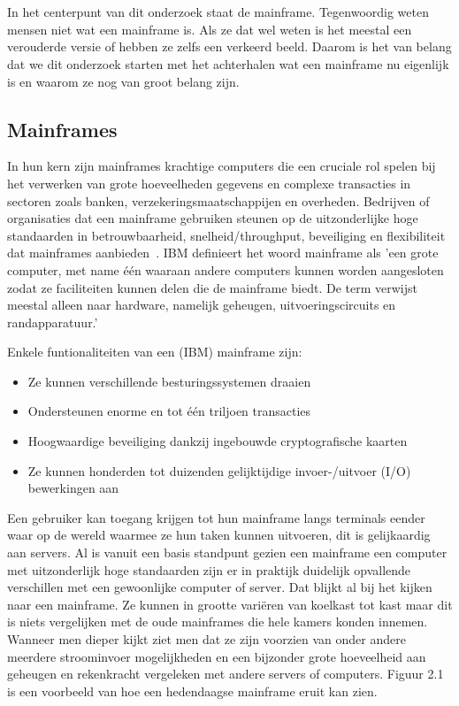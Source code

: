 \chapter{}%
\label{ch:stand-van-zaken}


In het centerpunt van dit onderzoek staat de mainframe. Tegenwoordig weten mensen niet wat een mainframe is. Als ze dat wel weten is het meestal een verouderde versie of hebben ze zelfs een verkeerd beeld. Daarom is het van belang dat we dit onderzoek starten met het achterhalen wat een mainframe nu eigenlijk is en waarom ze nog van groot belang zijn.

\section{Mainframes}
In hun kern zijn mainframes krachtige computers die een cruciale rol spelen bij het verwerken van grote hoeveelheden gegevens en complexe transacties in sectoren zoals banken, verzekeringsmaatschappijen en overheden. Bedrijven of organisaties dat een mainframe gebruiken steunen op de uitzonderlijke hoge standaarden in betrouwbaarheid, snelheid/throughput, beveiliging en flexibiliteit dat mainframes aanbieden~\autocite{IBM2023(1),IBM2023(2)}. IBM definieert het woord mainframe als 'een grote computer, met name één waaraan andere computers kunnen worden aangesloten zodat ze faciliteiten kunnen delen die de mainframe biedt. De term verwijst meestal alleen naar hardware, namelijk geheugen, uitvoeringscircuits en randapparatuur.'~\autocite{IBMArchives}

Enkele funtionaliteiten van een (IBM) mainframe zijn:

\begin{itemize}
    \item Ze kunnen verschillende besturingssystemen draaien
    \item Ondersteunen enorme en tot één triljoen transacties
    \item Hoogwaardige beveiliging dankzij ingebouwde cryptografische kaarten
    \item Ze kunnen honderden tot duizenden gelijktijdige invoer-/uitvoer (I/O) bewerkingen aan
\end{itemize}
 
Een gebruiker kan toegang krijgen tot hun mainframe langs terminals eender waar op de wereld waarmee ze hun taken kunnen uitvoeren, dit is gelijkaardig aan servers. Al is vanuit een basis standpunt gezien een mainframe een computer met uitzonderlijk hoge standaarden zijn er in praktijk duidelijk opvallende verschillen met een gewoonlijke computer of server. Dat blijkt al bij het kijken naar een mainframe. Ze kunnen in grootte variëren van koelkast tot kast maar dit is niets vergelijken met de oude mainframes die hele kamers konden innemen. Wanneer men dieper kijkt ziet men dat ze zijn voorzien van onder andere meerdere stroominvoer mogelijkheden en een bijzonder grote hoeveelheid aan geheugen en rekenkracht vergeleken met andere servers of computers. Figuur 2.1 is een voorbeeld van hoe een hedendaagse mainframe eruit kan zien.~\autocite{ChristopherTozzi}


